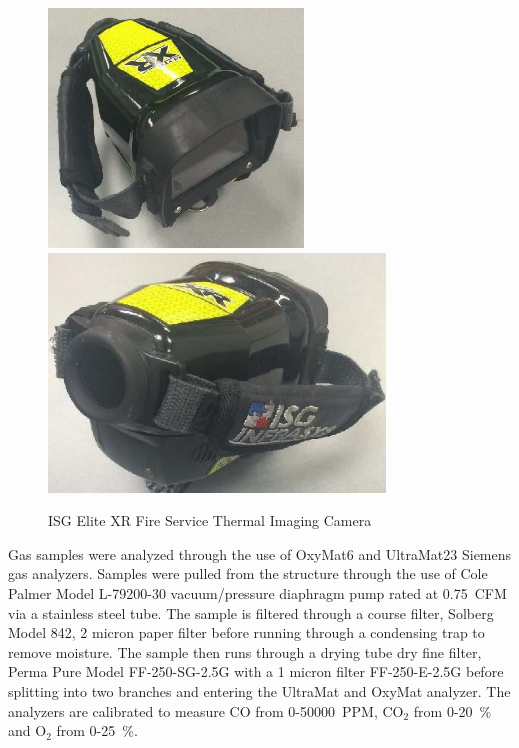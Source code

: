 \documentclass[12pt,oneside]{book}
\begin{document}
\begin{figure}[H]
	\centering
	\includegraphics[height = 2.5in]{0_Images/Instrumentation/ISG_IR.jpg}
	\includegraphics[height = 2.5in]{0_Images/Instrumentation/ISG_IR2.jpg}
	\caption{ISG Elite XR Fire Service Thermal Imaging Camera}
	\label{fig:IRCam}
\end{figure}

Gas samples were analyzed through the use of OxyMat6 and UltraMat23 Siemens gas analyzers. Samples were pulled from the structure through the use of Cole Palmer Model L-79200-30 vacuum/pressure diaphragm pump rated at 0.75~CFM via a stainless steel tube. The sample is filtered through a course filter, Solberg Model 842, 2 micron paper filter before running through a condensing trap to remove moisture. The sample then runs through a drying tube dry fine filter, Perma Pure Model FF-250-SG-2.5G with a 1 micron filter FF-250-E-2.5G before splitting into two branches and entering the UltraMat and OxyMat analyzer. The analyzers are calibrated to measure CO from 0-50000~PPM, CO$_2$ from 0-20~\% and O$_2$ from 0-25~\%. 
\end{document}
